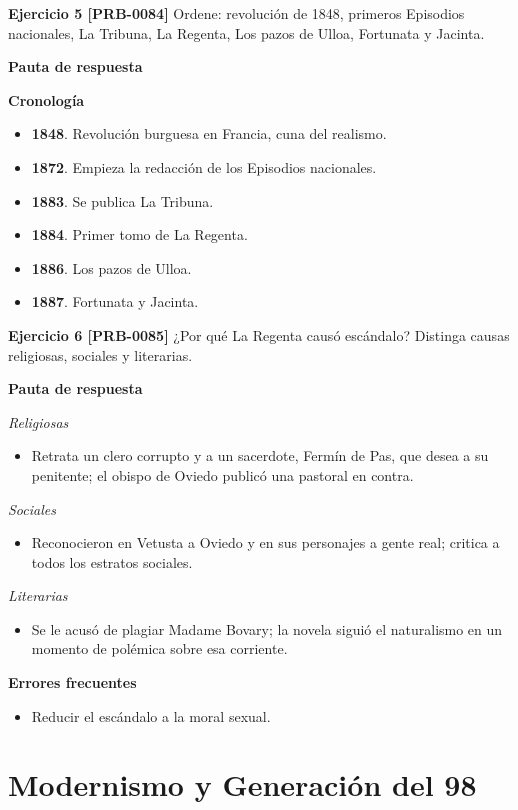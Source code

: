 \documentclass{book}
\begin{document}
\noindent\textbf{Ejercicio 5 [PRB-0084]}
Ordene: revolución de 1848, primeros Episodios nacionales, La Tribuna, La Regenta, Los pazos de Ulloa, Fortunata y Jacinta.


\noindent\textbf{Pauta de respuesta}

\noindent\textbf{Cronología}
\begin{itemize}
\item \textbf{1848}. Revolución burguesa en Francia, cuna del realismo.
\item \textbf{1872}. Empieza la redacción de los Episodios nacionales.
\item \textbf{1883}. Se publica La Tribuna.
\item \textbf{1884}. Primer tomo de La Regenta.
\item \textbf{1886}. Los pazos de Ulloa.
\item \textbf{1887}. Fortunata y Jacinta.
\end{itemize}

\noindent\textbf{Ejercicio 6 [PRB-0085]}
¿Por qué La Regenta causó escándalo? Distinga causas religiosas, sociales y literarias.


\noindent\textbf{Pauta de respuesta}

\noindent\textit{Religiosas}
\begin{itemize}
\item Retrata un clero corrupto y a un sacerdote, Fermín de Pas, que desea a su penitente; el obispo de Oviedo publicó una pastoral en contra.
\end{itemize}

\noindent\textit{Sociales}
\begin{itemize}
\item Reconocieron en Vetusta a Oviedo y en sus personajes a gente real; critica a todos los estratos sociales.
\end{itemize}

\noindent\textit{Literarias}
\begin{itemize}
\item Se le acusó de plagiar Madame Bovary; la novela siguió el naturalismo en un momento de polémica sobre esa corriente.
\end{itemize}

\noindent\textbf{Errores frecuentes}
\begin{itemize}
\item Reducir el escándalo a la moral sexual.
\end{itemize}

\section{Modernismo y Generación del 98}
\end{document}
